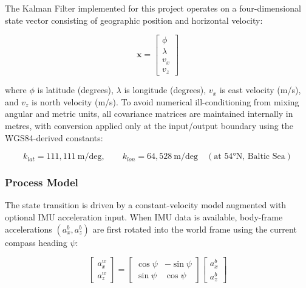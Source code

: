     The Kalman Filter implemented for this project operates on a
    four-dimensional state vector consisting of geographic position and
    horizontal velocity:

    \begin{equation}
        \mathbf{x} = \begin{bmatrix} \phi \\ \lambda \\ v_x \\ v_z \end{bmatrix}
    \end{equation}

    where $\phi$ is latitude (degrees), $\lambda$ is longitude (degrees),
    $v_x$ is east velocity (m/s), and $v_z$ is north velocity (m/s).
    To avoid numerical ill-conditioning from mixing angular and metric units,
    all covariance matrices are maintained internally in metres, with
    conversion applied only at the input/output boundary using the
    WGS84-derived constants:

    \begin{equation}
        k_{lat} = 111{,}111 \ \text{m/deg}, \qquad
        k_{lon} = 64{,}528 \ \text{m/deg} \quad (\text{at } 54°\text{N, Baltic Sea})
    \end{equation}

    \subsubsection{Process Model}

    The state transition is driven by a constant-velocity model augmented
    with optional IMU acceleration input. When IMU data is available,
    body-frame accelerations $(a_x^b, a_z^b)$ are first rotated into the
    world frame using the current compass heading $\psi$:

    \begin{equation}
        \begin{bmatrix} a_x^w \\ a_z^w \end{bmatrix}
        =
        \begin{bmatrix}
            \cos\psi & -\sin\psi \\
            \sin\psi &  \cos\psi
        \end{bmatrix}
        \begin{bmatrix} a_x^b \\ a_z^b \end{bmatrix}
    \end{equation}

